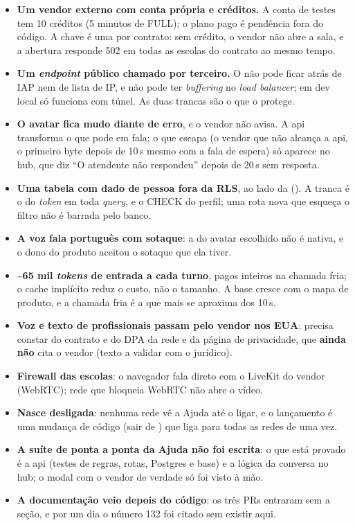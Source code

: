 \begin{itemize}
  \item \textbf{Um vendor externo com conta própria e créditos.} A conta de
    testes tem 10 créditos (5 minutos de FULL); o plano pago é pendência fora do
    código. A chave é uma por contrato: sem crédito, o vendor não abre a sala, e
    a abertura responde 502  em todas as escolas do contrato
    ao mesmo tempo.
  \item \textbf{Um \emph{endpoint} público chamado por terceiro.} O
     não pode ficar atrás de IAP nem de lista de IP, e não pode
    ter \emph{buffering} no \emph{load balancer}; em dev local só funciona com
    túnel. As duas trancas são o que o protege.
  \item \textbf{O avatar fica mudo diante de erro}, e o vendor não avisa. A
    api transforma o que pode em fala; o que escapa (o vendor que não alcança a
    api, o primeiro byte depois de 10\,s mesmo com a fala de espera)
    só aparece no hub, que diz \enquote{O atendente não respondeu} depois de
    20\,s sem resposta.
  \item \textbf{Uma tabela com dado de pessoa fora da RLS}, ao lado da
     (). A tranca é o  do \emph{token} em
    toda \emph{query}, e o CHECK do perfil; uma rota nova que esqueça o filtro
    não é barrada pelo banco.
  \item \textbf{A voz fala português com sotaque}: a do avatar escolhido não é
    nativa, e o dono do produto aceitou o sotaque que ela tiver.
  \item \textbf{\textasciitilde65 mil \emph{tokens} de entrada a cada turno},
    pagos inteiros na chamada fria; o cache implícito reduz o custo, não o
    tamanho. A base cresce com o mapa de produto, e a chamada fria é a que mais
    se aproxima dos 10\,s.
  \item \textbf{Voz e texto de profissionais passam pelo vendor nos EUA}: precisa
    constar do contrato e do DPA da rede e da página de privacidade, que
    \textbf{ainda não} cita o vendor (texto a validar com o jurídico).
  \item \textbf{Firewall das escolas}: o navegador fala direto com o LiveKit do
    vendor (WebRTC); rede que bloqueia WebRTC não abre o vídeo.
  \item \textbf{Nasce desligada}: nenhuma rede vê a Ajuda até o  ligar,
    e o lançamento é uma mudança de código (sair de
    ) que liga para todas as redes de uma
    vez.
  \item \textbf{A suíte de ponta a ponta da Ajuda não foi escrita}: o que está
    provado é a api (testes de regras, rotas, Postgres e base) e a lógica da
    conversa no hub; o modal com o vendor de verdade só foi visto à mão.
  \item \textbf{A documentação veio depois do código}: os três PRs entraram sem
    a seção, e por um dia o número 132 foi citado sem existir aqui.
\end{itemize}

